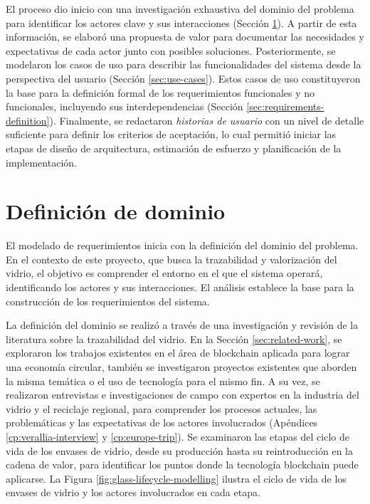 El proceso dio inicio con una investigación exhaustiva del dominio del problema para identificar los actores clave y sus interacciones (Sección \ref{sec:domain-definition}). A partir de esta información, se elaboró una propuesta de valor para documentar las necesidades y expectativas de cada actor junto con posibles soluciones. Posteriormente, se modelaron los casos de uso para describir las funcionalidades del sistema desde la perspectiva del usuario (Sección \ref{sec:use-cases}). Estos casos de uso constituyeron la base para la definición formal de los requerimientos funcionales y no funcionales, incluyendo sus interdependencias (Sección \ref{sec:requirements-definition}). Finalmente, se redactaron \textit{historias de usuario} con un nivel de detalle suficiente para definir los criterios de aceptación, lo cual permitió iniciar las etapas de diseño de arquitectura, estimación de esfuerzo y planificación de la implementación.

\section{Definición de dominio}
\label{sec:domain-definition}

El modelado de requerimientos inicia con la definición del dominio del problema. En el contexto de este proyecto, que busca la trazabilidad y valorización del vidrio, el objetivo es comprender el entorno en el que el sistema operará, identificando los actores y sus interacciones. El análisis establece la base para la construcción de los requerimientos del sistema.

La definición del dominio se realizó a través de una investigación y revisión de la literatura sobre la \gls{trazabilidad} del vidrio. En la Sección \ref{sec:related-work}, se exploraron los trabajos existentes en el área de blockchain aplicada para lograr una economía circular, también se investigaron proyectos existentes que aborden la misma temática o el uso de tecnología para el mismo fin. A su vez, se realizaron entrevistas e investigaciones de campo con expertos en la industria del vidrio y el reciclaje regional, para comprender los procesos actuales, las problemáticas y las expectativas de los actores involucrados (Apéndices \ref{cp:verallia-interview} y \ref{cp:europe-trip}). Se examinaron las etapas del ciclo de vida de los envases de vidrio, desde su producción hasta su reintroducción en la cadena de valor, para identificar los puntos donde la tecnología blockchain puede aplicarse. La Figura \ref{fig:glass-lifecycle-modelling} ilustra el ciclo de vida de los envases de vidrio y los actores involucrados en cada etapa.

